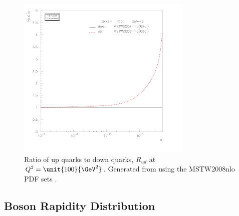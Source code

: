 \begin{figure}[htbp]
  \centering
  \includegraphics[width=0.75\textwidth]{plot_pdf_ratio}
  \caption[Ratio of up quarks to down quarks, $R_{ud}$ at $Q^2=\unit{100}{\GeV^2}$.] 
{Ratio of up quarks to down quarks, $R_{ud}$ at $Q^2=\unit{100}{\GeV^2}$.  Generated from \cite{hepdata} using the MSTW2008nlo
PDF sets \cite{martin2009parton}.}
  \label{fig:pdf_plots} 
\end{figure}

\subsection{\PW Boson Rapidity Distribution}
\label{wbos:wrapsec}


